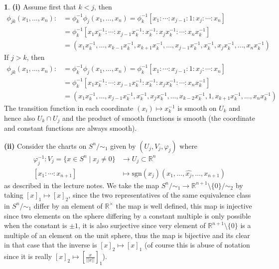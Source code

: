 \documentclass[10.5pt]{article}
\theoremstyle{definition}
\newtheorem{pb}{}
\newcommand{\set}[1]{\{#1\}}
\newcommand{\norm}[1]{\lvert\lvert#1\rvert\rvert}
\begin{document}
    \begin{pb}
        \textbf{(i)} Assume first that \(k<j\), then
        \begin{align*}
            \phi_{jk}(x_1,\hdots,x_n) :&= \phi_k^{-1}\phi_j(x_1,\hdots,x_n) = \phi_k^{-1}[x_1:\cdots:x_{j-1}:1:x_j:\cdots:x_n] \\
            &= \phi_k^{-1}[x_1x_k^{-1}:\cdots:x_{j-1}x_k^{-1}:x_k^{-1}:x_jx_k^{-1}:\cdots:x_nx_k^{-1}] \\
            &= (x_1x_k^{-1},\hdots,x_{k-1}x_k^{-1},x_{k+1}x_k^{-1},\hdots,x_{j-1}x_k^{-1},x_k^{-1},x_jx_k^{-1},\hdots,x_nx_k^{-1})
        \end{align*}
        If \(j > k\), then
        \begin{align*}
            \phi_{jk}(x_1,\hdots,x_n) :&= \phi_k^{-1}\phi_j(x_1,\hdots,x_n) = \phi_k^{-1}[x_1:\cdots:x_{j-1}:1:x_j:\cdots:x_n] \\
            &= \phi_k^{-1}[x_1x_k^{-1}:\cdots:x_{j-1}x_k^{-1}:x_k^{-1}:x_jx_k^{-1}:\cdots:x_nx_k^{-1}] \\
            &= (x_1x_k^{-1},\hdots,x_{j-1}x_k^{-1},x_k^{-1},x_jx_k^{-1},\hdots,x_{k-2}x_k^{-1},1,x_{k+1}x_k^{-1},\hdots,x_nx_k^{-1})
        \end{align*}
        The transition function in each coordinate \((x_i) \mapsto x_k^{-1}\) is smooth on \(U_k\) and hence also \(U_k \cap U_j\) and the product of smooth functions is smooth (the coordinate and constant functions are always smooth).

        \textbf{(ii)} Consider the charts on \(S^n/\sim_1\) given by \((U_j,V_j,\varphi_j)\) where \begin{align*}\varphi_j^{-1}: V_j = \set{x \in S^n \mid x_j \neq 0} &\to U_j \subset \mathbb{R}^n \\ [x_1:\cdots:x_{n+1}] &\mapsto \text{sgn}(x_j)(x_1,\hdots,\widehat{x_j},\hdots,x_{n+1})\end{align*} as described in the lecture notes.
         We take the map \(S^n/\sim_1 \to \mathbb{R}^{n+1}\setminus\set{0}/\sim_2\) by taking \([x]_1 \mapsto [x]_2\), since the two representatives of the same equivalence class in \(S^n/\sim_1\) differ by an element of \(\mathbb{R}^\times\) the map is well defined, this map is injective since two elements on the sphere differing by a constant multiple is only possible when the constant is \(\pm 1\), it is also surjective since very element of \(\mathbb{R}^{n+1}\setminus\set{0}\) is a multiple of an element on the unit sphere, thus the map is bijective and its clear in that case that the inverse is \([x]_2 \mapsto [x]_1\) (of course this is abuse of notation since it is really \([x]_2 \mapsto \left[\frac{x}{\norm{x}}\right]_1\)).  


\end{pb}
\end{document}
